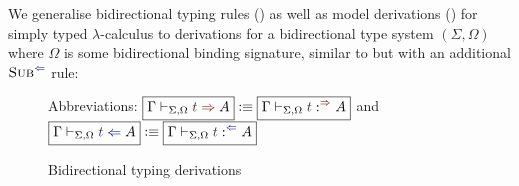 We generalise bidirectional typing rules () as well as model derivations () for simply typed $\lambda$-calculus to derivations for a bidirectional type system $(\Sigma, \Omega)$ where $\Omega$ is some bidirectional binding signature, similar to  but with an additional $\ChkRule{Sub}$ rule:
\begin{definition}\label{def:bidirectional-typing-derivations}\label{def:mode-derivations}
  \begin{figure}
    \centering
    \small
    Abbreviations: $\boxed{\Gamma \vdash_{\Sigma, \Omega} \isTerm{t} \syn A} \defeq \boxed{\Gamma \vdash_{\Sigma, \Omega} \isTerm{t} :^{\syn} A}$ and $\boxed{\Gamma \vdash_{\Sigma, \Omega} \isTerm{t} \chk A} \defeq \boxed{\Gamma \vdash_{\Sigma, \Omega} \isTerm{t} :^{\chk} A}$
    \caption{Bidirectional typing derivations}
    \label{fig:bidirectional-typing-derivations}
  \end{figure}
  \begin{figure}
    \centering
    \small
    \begin{mathpar}

\end{mathpar}
\end{figure}
\end{definition}
